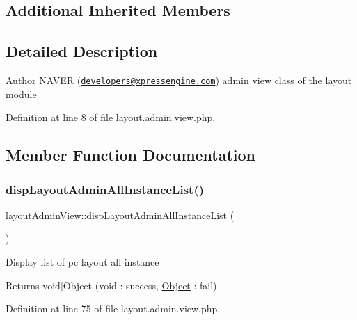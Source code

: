\subsection*{Additional Inherited Members}


\subsection{Detailed Description}
\begin{DoxyAuthor}{Author}
N\+A\+V\+ER (\href{mailto:developers@xpressengine.com}{\tt developers@xpressengine.\+com}) admin view class of the layout module 
\end{DoxyAuthor}


Definition at line 8 of file layout.\+admin.\+view.\+php.



\subsection{Member Function Documentation}
\mbox{\label{classlayoutAdminView_a278b148cb2673f86c08fe932b1db38e8}} 
\subsubsection{\texorpdfstring{disp\+Layout\+Admin\+All\+Instance\+List()}{dispLayoutAdminAllInstanceList()}}
{\footnotesize\ttfamily layout\+Admin\+View\+::disp\+Layout\+Admin\+All\+Instance\+List (\begin{DoxyParamCaption}{ }\end{DoxyParamCaption})}

Display list of pc layout all instance \begin{DoxyReturn}{Returns}
void$\vert$\+Object (void \+: success, \hyperlink{classObject}{Object} \+: fail) 
\end{DoxyReturn}


Definition at line 75 of file layout.\+admin.\+view.\+php.

\mbox{\label{classlayoutAdminView_a48e095b862b7cb1482e94fec3c7624cc}} 
